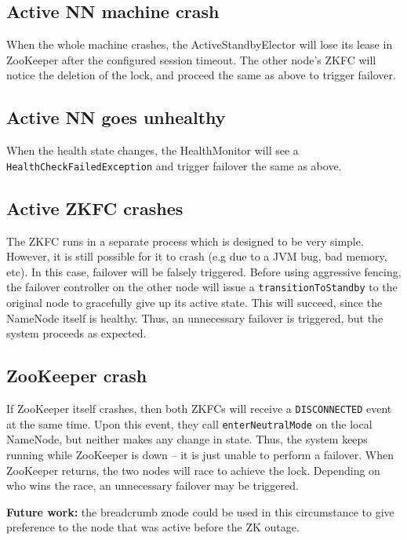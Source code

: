 \documentclass{article}
\begin{document}
\subsection{Active NN machine crash}

When the whole machine crashes, the ActiveStandbyElector will lose its lease in ZooKeeper after the configured session timeout. The other node's ZKFC will notice the deletion of the lock, and proceed the same as above to trigger failover.

\subsection{Active NN goes unhealthy}

When the health state changes, the HealthMonitor will see a {\tt HealthCheckFailedException} and trigger failover the same as above.

\subsection{Active ZKFC crashes}

The ZKFC runs in a separate process which is designed to be very simple. However, it is still possible for it to crash (e.g due to a JVM bug, bad memory, etc). In this case, failover will be falsely triggered. Before using aggressive fencing, the failover controller on the other node will issue a {\tt transitionToStandby} to the original node to gracefully give up its active state. This will succeed, since the NameNode itself is healthy. Thus, an unnecessary failover is triggered, but the system proceeds as expected.

\subsection{ZooKeeper crash}

If ZooKeeper itself crashes, then both ZKFCs will receive a {\tt DISCONNECTED} event at the same time. Upon this event, they call {\tt enterNeutralMode} on the local NameNode, but neither makes any change in state. Thus, the system keeps running while ZooKeeper is down -- it is just unable to perform a failover. When ZooKeeper returns, the two nodes will race to achieve the lock. Depending on who wins the race, an unnecessary failover may be triggered.

{\bf Future work:} the breadcrumb znode could be used in this circumstance to give preference to the node that was active before the ZK outage.
\end{document}
